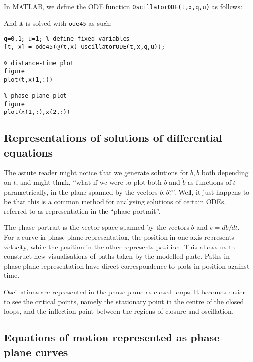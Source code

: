 \documentclass{article}
\begin{document}
In MATLAB, we define the ODE function \texttt{OscillatorODE(t,x,q,u)} as follows:


And it is solved with \texttt{ode45} as such:

\begin{verbatim}
q=0.1; u=1; % define fixed variables
[t, x] = ode45(@(t,x) OscillatorODE(t,x,q,u));

% distance-time plot
figure
plot(t,x(1,:))

% phase-plane plot
figure
plot(x(1,:),x(2,:))
\end{verbatim}

\subsection{Representations of solutions of differential equations}


The astute reader might notice that we generate solutions for $b,\dot{b}$ both depending on $t$,
and might think, ``what if we were to plot both $b$ and $\dot{b}$ as functions of $t$ parametrically,
in the plane spanned by the vectors $b,\dot{b}$?''.
Well, it just happens to be that this is a common method for analysing solutions of certain ODEs,
referred to as representation in the ``phase portrait''. %

The phase-portrait is the vector space spanned by the vectors $b$ and $\dot{b}=db/dt$.
For a curve in phase-plane representation, the position in one axis represents velocity, while the position in the other represents position.
This allows us to construct new visualisations of paths taken by the modelled plate.
Paths in phase-plane representation have direct correspondence to plots in position against time.


Oscillations are represented in the phase-plane as closed loops.
It becomes easier to see the critical points,
namely the stationary point in the centre of the closed loops,
and the inflection point between the regions of closure and oscillation.

\subsection{Equations of motion represented as phase-plane curves}
\end{document}
